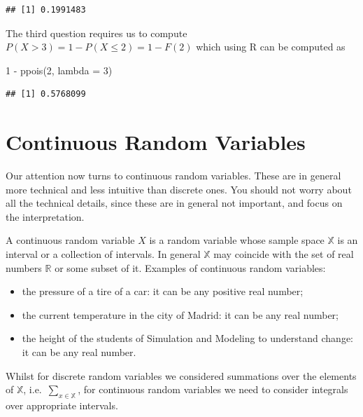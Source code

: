 \documentclass[
]{book}
\newenvironment{Shaded}{\begin{snugshade}}{\end{snugshade}}
\newcommand{\AttributeTok}[1]{\textcolor[rgb]{0.77,0.63,0.00}{#1}}
\newcommand{\DecValTok}[1]{\textcolor[rgb]{0.00,0.00,0.81}{#1}}
\newcommand{\FunctionTok}[1]{\textcolor[rgb]{0.00,0.00,0.00}{#1}}
\newcommand{\NormalTok}[1]{#1}
\newcommand{\SpecialCharTok}[1]{\textcolor[rgb]{0.00,0.00,0.00}{#1}}
\begin{document}
\begin{verbatim}
## [1] 0.1991483
\end{verbatim}

The third question requires us to compute \(P(X>3) = 1 - P(X\leq 2) = 1 - F(2)\) which using R can be computed as

\begin{Shaded}
\begin{Highlighting}[]
\DecValTok{1} \SpecialCharTok{{-}} \FunctionTok{ppois}\NormalTok{(}\DecValTok{2}\NormalTok{, }\AttributeTok{lambda =} \DecValTok{3}\NormalTok{)}
\end{Highlighting}
\end{Shaded}

\begin{verbatim}
## [1] 0.5768099
\end{verbatim}

\hypertarget{continuous-random-variables}{%
\section{Continuous Random Variables}\label{continuous-random-variables}}

Our attention now turns to continuous random variables. These are in general more technical and less intuitive than discrete ones. You should not worry about all the technical details, since these are in general not important, and focus on the interpretation.

A continuous random variable \(X\) is a random variable whose sample space \(\mathbb{X}\) is an interval or a collection of intervals. In general \(\mathbb{X}\) may coincide with the set of real numbers \(\mathbb{R}\) or some subset of it. Examples of continuous random variables:

\begin{itemize}
\item
  the pressure of a tire of a car: it can be any positive real number;
\item
  the current temperature in the city of Madrid: it can be any real number;
\item
  the height of the students of Simulation and Modeling to understand change: it can be any real number.
\end{itemize}

Whilst for discrete random variables we considered summations over the elements of \(\mathbb{X}\), i.e.~\(\sum_{x\in\mathbb{X}}\), for continuous random variables we need to consider integrals over appropriate intervals.
\end{document}
